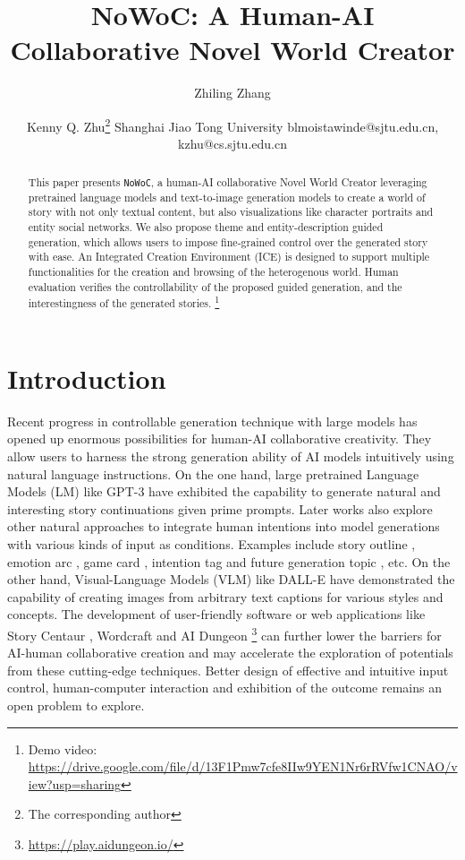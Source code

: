 \documentclass{article}
\title{NoWoC: A Human-AI Collaborative Novel World Creator}
\author{
Zhiling Zhang
\and
Kenny Q. Zhu\thanks{The corresponding author}
\affiliations
Shanghai Jiao Tong University
\emails
blmoistawinde@sjtu.edu.cn,
kzhu@cs.sjtu.edu.cn
}
\begin{document}
\maketitle

\begin{abstract}
  This paper presents \texttt{NoWoC}, a human-AI collaborative Novel World Creator leveraging pretrained language models and text-to-image generation models to create a world of story with not only textual content, but also visualizations like character portraits and entity social networks. We also propose theme and entity-description guided generation, which allows users to impose fine-grained control over the generated story with ease. An Integrated Creation Environment (ICE) is designed to support multiple functionalities for the creation and browsing of the heterogenous world. Human evaluation verifies the controllability of the proposed guided generation, and the interestingness of the generated stories. \footnote{Demo video: \url{https://drive.google.com/file/d/13F1Pmw7cfe8IIw9YEN1Nr6rRVfw1CNAO/view?usp=sharing}}
\end{abstract}

\section{Introduction}

Recent progress in controllable generation technique with large models has opened 
up enormous possibilities for human-AI collaborative creativity. They allow users 
to harness the strong generation ability of AI models intuitively using natural language instructions. On the one hand, large pretrained Language Models (LM) like GPT-3 \cite{brown2020language} have exhibited the capability to generate natural and interesting 
story continuations given prime prompts. Later works also explore other natural approaches to integrate human intentions into model generations with various kinds of input as conditions. Examples include story outline \cite{rashkin2020plotmachines}, emotion arc \cite{brahman2020modeling}, game card \cite{akoury2020storium}, intention tag \cite{sun2021iga} and future generation topic \cite{chang2021changing}, etc. On the other hand, Visual-Language Models (VLM) like DALL-E \cite{ramesh2021zero} have demonstrated the capability of creating images from arbitrary text captions for various styles and concepts. The development of user-friendly software or web applications like Story Centaur \cite{swanson2021story}, Wordcraft \cite{coenen2021wordcraft} and AI Dungeon \footnote{\url{https://play.aidungeon.io/}} can further lower the barriers for AI-human collaborative creation and may accelerate the exploration of potentials from these cutting-edge techniques. Better design of effective and intuitive input control, human-computer interaction and exhibition of the outcome remains an open problem to explore.
\end{document}
